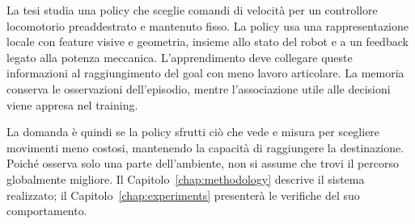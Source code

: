 La tesi studia una policy che sceglie comandi di velocità per un controllore locomotorio preaddestrato e mantenuto fisso. La policy usa una rappresentazione locale con feature visive e geometria, insieme allo stato del robot e a un feedback legato alla potenza meccanica. L'apprendimento deve collegare queste informazioni al raggiungimento del goal con meno lavoro articolare. La memoria conserva le osservazioni dell'episodio, mentre l'associazione utile alle decisioni viene appresa nel training.

La domanda è quindi se la policy sfrutti ciò che vede e misura per scegliere movimenti meno costosi, mantenendo la capacità di raggiungere la destinazione. Poiché osserva solo una parte dell'ambiente, non si assume che trovi il percorso globalmente migliore. Il Capitolo~\ref{chap:methodology} descrive il sistema realizzato; il Capitolo~\ref{chap:experiments} presenterà le verifiche del suo comportamento.
